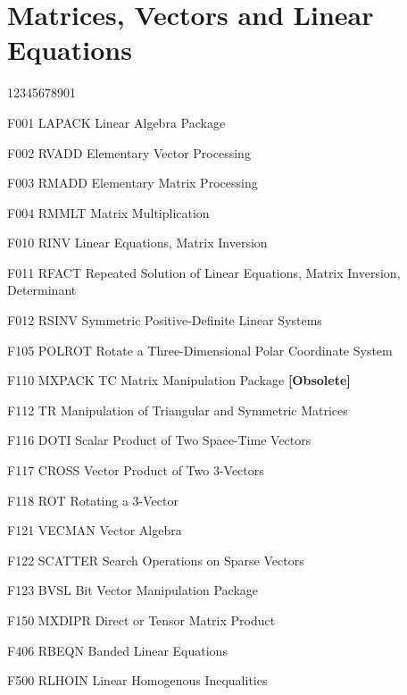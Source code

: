 \section*{Matrices, Vectors and Linear Equations}
\begin{DLtt}{12345678901}
\item[F001 LAPACK] Linear Algebra Package
\item[F002 RVADD] Elementary Vector Processing
\item[F003 RMADD] Elementary Matrix Processing
\item[F004 RMMLT] Matrix Multiplication
\item[F010 RINV] Linear Equations, Matrix Inversion
\item[F011 RFACT] Repeated Solution of Linear Equations,
Matrix Inversion, Determinant
\item[F012 RSINV] Symmetric Positive-Definite Linear Systems
\item[F105 POLROT] Rotate a Three-Dimensional Polar Coordinate System
\item[F110 MXPACK] TC Matrix Manipulation Package {\bf [Obsolete]}
\item[F112 TR] Manipulation of Triangular and Symmetric Matrices
\item[F116 DOTI] Scalar Product of Two Space-Time Vectors
\item[F117 CROSS] Vector Product of Two 3-Vectors
\item[F118 ROT] Rotating a 3-Vector
\item[F121 VECMAN] Vector Algebra
\item[F122 SCATTER] Search Operations on Sparse Vectors
\item[F123 BVSL] Bit Vector Manipulation Package
\item[F150 MXDIPR] Direct or Tensor Matrix Product
\item[F406 RBEQN] Banded Linear Equations
\item[F500 RLHOIN] Linear Homogenous Inequalities
\end{DLtt}
